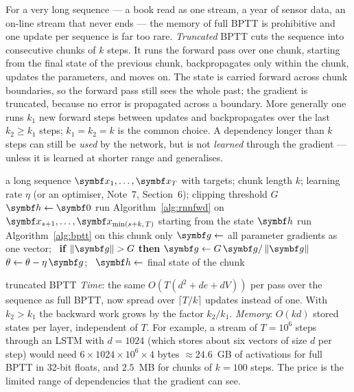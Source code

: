\documentclass[11pt]{article}
\newcommand{\hv}{\vect{h}}
\newcommand{\gv}{\vect{g}}
\begin{document}
For a very long sequence --- a book read as one stream, a year of sensor data, an on-line stream that never ends --- the
memory of full BPTT is prohibitive and one update per sequence is far too rare. \emph{Truncated} BPTT cuts the sequence
into consecutive chunks of $k$ steps. It runs the forward pass over one chunk, starting from the final state of the
previous chunk, backpropagates only within the chunk, updates the parameters, and moves on. The state is carried
forward across chunk boundaries, so the forward pass still sees the whole past; the gradient is truncated, because no
error is propagated across a boundary. More generally one runs $k_1$ new forward steps between updates and backpropagates
over the last $k_2 \ge k_1$ steps; $k_1 = k_2 = k$ is the common choice. A dependency longer than $k$ steps can still be
\emph{used} by the network, but is not \emph{learned} through the gradient --- unless it is learned at shorter range and
generalises.

\begin{algorithm}[htbp]
\caption{Truncated BPTT with gradient clipping over one long sequence ($k_1 = k_2 = k$)}\label{alg:tbptt}
\begin{algorithmic}[1]
\Require a long sequence $\x_1, \dots, \x_T$ with targets; chunk length $k$; learning rate $\eta$ (or an optimiser,
  Note~7, Section~6); clipping threshold $G$
  \State $\hv \gets \vect{0}$
    \State run Algorithm~\ref{alg:rnnfwd} on $\x_{s+1}, \dots, \x_{\min(s+k,\,T)}$ starting from the state $\hv$
    \State run Algorithm~\ref{alg:bptt} on this chunk only \Comment{the incoming $\hv$ is a constant}
    \State $\gv \gets$ all parameter gradients as one vector; \ \textbf{if} $\norm{\gv} > G$ \textbf{then} $\gv \gets G\,\gv/\norm{\gv}$
    \State $\theta \gets \theta - \eta\,\gv$; \ $\hv \gets$ final state of the chunk 
  \EndFor
\EndFunction
\end{algorithmic}
\end{algorithm}

\begin{runtime}{truncated BPTT}
\emph{Time}: the same $O(T(d^2 + de + dV))$ per pass over the sequence as full BPTT, now spread over $\lceil T/k\rceil$
updates instead of one. With $k_2 > k_1$ the backward work grows by the factor $k_2/k_1$. \emph{Memory}: $O(kd)$ stored states
per layer, independent of $T$. For example, a stream of $T = 10^6$ steps through an LSTM with $d = 1024$ (which stores
about six vectors of size $d$ per step) would need $6 \times 1024 \times 10^6 \times 4$ bytes $\approx 24.6$~GB of activations for
full BPTT in 32-bit floats, and $2.5$~MB for chunks of $k = 100$ steps. The price is the limited range of dependencies
that the gradient can see.
\end{runtime}
\end{document}
